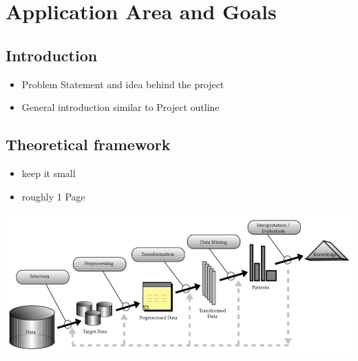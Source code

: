 \chapter{Application Area and Goals}
\label{cha:area_goals}
\section{Introduction}
\begin{itemize}
	\item Problem Statement and idea behind the project
	\item General introduction similar to Project outline
\end{itemize}

\section{Theoretical framework}
\begin{itemize}
	\item keep it small
	\item roughly 1 Page
\end{itemize}
\includegraphics[width=\textwidth]{images/DM_Process.png}



